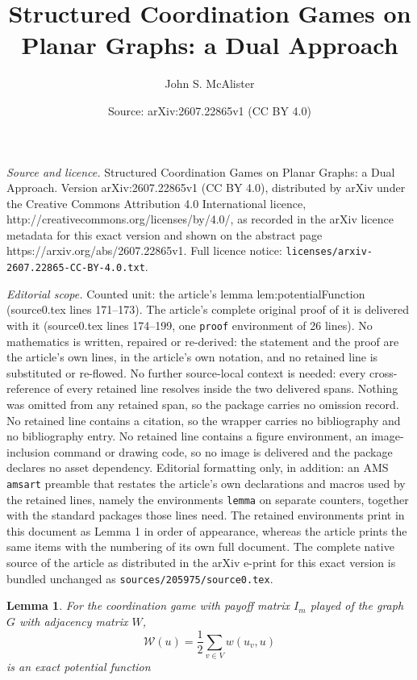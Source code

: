 \documentclass[10pt,a4paper]{amsart}
\title{Structured Coordination Games on Planar Graphs: a Dual Approach}
\author{John S. McAlister}
\date{Source: arXiv:2607.22865v1 (CC BY 4.0)}
\newtheorem{lemma}{Lemma}
\begin{document}
\maketitle

\noindent\emph{Source and licence.} Structured Coordination Games on Planar Graphs: a Dual Approach. Version arXiv:2607.22865v1 (CC BY 4.0), distributed by arXiv under the Creative Commons Attribution 4.0 International licence, http://creativecommons.org/licenses/by/4.0/, as recorded in the arXiv licence metadata for this exact version and shown on the abstract page https://arxiv.org/abs/2607.22865v1. Full licence notice: \texttt{licenses/arxiv-2607.22865-CC-BY-4.0.txt}.\par\smallskip

\noindent\textit{Editorial scope.} Counted unit: the article's lemma lem:potentialFunction (source0.tex lines 171--173). The article's complete original proof of it is delivered with it (source0.tex lines 174--199, one \texttt{proof} environment of 26 lines). No mathematics is written, repaired or re-derived: the statement and the proof are the article's own lines, in the article's own notation, and no retained line is substituted or re-flowed.  No further source-local context is needed: every cross-reference of every retained line resolves inside the two delivered spans.  Nothing was omitted from any retained span, so the package carries no omission record.  No retained line contains a citation, so the wrapper carries no bibliography and no bibliography entry.  No retained line contains a figure environment, an image-inclusion command or drawing code, so no image is delivered and the package declares no asset dependency.  Editorial formatting only, in addition: an AMS \texttt{amsart} preamble that restates the article's own declarations and macros used by the retained lines, namely the environments \texttt{lemma} on separate counters, together with the standard packages those lines need.  The retained environments print in this document as Lemma 1 in order of appearance, whereas the article prints the same items with the numbering of its own full document.  The complete native source of the article as distributed in the arXiv e-print for this exact version is bundled unchanged as \texttt{sources/205975/source0.tex}.
\begin{lemma}\label{lem:potentialFunction}
    For the coordination game with payoff matrix $I_m$ played of the graph $G$ with adjacency matrix $W$, \[\mathcal{W}(u)=\frac{1}{2}\sum_{v\in V}w(u_v,u)\] is an exact potential function
\end{lemma}
\end{document}
